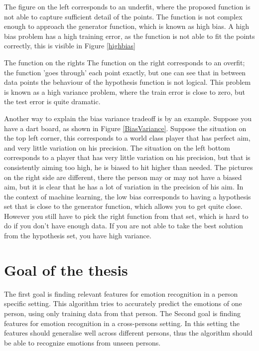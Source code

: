 The figure on the left corresponds to an underfit, where the proposed function is not able to capture sufficient detail of the points. The function is not complex enough to approach the generator function, which is known as high bias. A high bias problem has a high training error, as the function is not able to fit the points correctly, this is visible in Figure \ref{highbias}


The function on the rights The function on the right corresponds to an overfit; the function 'goes through' each point exactly, but one can see that in between data points the behaviour of the hypothesis function is not logical. This problem is known as a high variance problem, where the train error is close to zero, but the test error is quite dramatic. 


Another way to explain the bias variance tradeoff is by an example. Suppose you have a dart board, as shown in Figure \ref{BiasVariance}. Suppose the situation on the top left corner, this corresponds to a world class player that has perfect aim, and very little variation on his precision. The situation on the left bottom corresponds to a player that has very little variation on his precision, but that is consistently aiming too high, he is biased to hit higher than needed. The pictures on the right side are different, there the person may or may not have a biased aim, but it is clear that he has a lot of variation in the precision of his aim.
\npar
In the context of machine learning, the low bias corresponds to having a hypothesis set that is close to the generator function, which allows you to get quite close. However you still have to pick the right function from that set, which is hard to do if you don't have enough data. If you are not able to take the best solution from the hypothesis set, you have high variance.


\section{Goal of the thesis}
The first goal is finding relevant features for emotion recognition in a person specific setting. This algorithm tries to accurately predict the emotions of one person, using only training data from that person. The Second goal is finding features for emotion recognition in a cross-persons setting. In this setting the features should generalise well across different persons, thus the algorithm should be able to recognize emotions from unseen persons.

